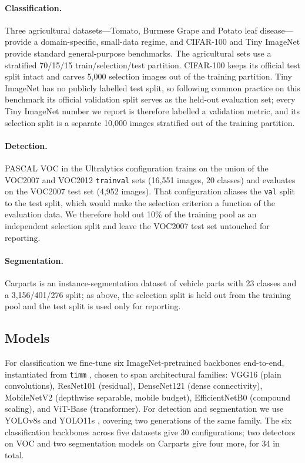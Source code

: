 \paragraph{Classification.}
Three agricultural datasets---Tomato, Burmese Grape and Potato leaf
disease---provide a domain-specific, small-data regime, and CIFAR-100 and Tiny
ImageNet provide standard general-purpose benchmarks. The agricultural sets use
a stratified 70/15/15 train/selection/test partition. CIFAR-100 keeps its
official test split intact and carves 5,000 selection images out of the
training partition. Tiny ImageNet has no publicly labelled test split, so
following common practice on this benchmark
\cite{abai2019densenet,huynh2022vision} its official validation split serves as
the held-out evaluation set; every Tiny ImageNet number we report is therefore
labelled a validation metric, and its selection split is a separate 10,000
images stratified out of the training partition.

\paragraph{Detection.}
PASCAL VOC \cite{everingham2010pascal} in the Ultralytics configuration trains
on the union of the VOC2007 and VOC2012 \texttt{trainval} sets (16,551 images,
20 classes) and evaluates on the VOC2007 test set (4,952 images). That
configuration aliases the \texttt{val} split to the test split, which would
make the selection criterion a function of the evaluation data. We therefore
hold out 10\% of the training pool as an independent selection split and leave
the VOC2007 test set untouched for reporting.

\paragraph{Segmentation.}
Carparts \cite{ultralytics2024carparts} is an instance-segmentation dataset of
vehicle parts with 23 classes and a 3,156/401/276 split; as above, the
selection split is held out from the training pool and the test split is used
only for reporting.

\subsection{Models}

For classification we fine-tune six ImageNet-pretrained backbones end-to-end,
instantiated from \texttt{timm} \cite{rw2019timm}, chosen to span
architectural families: VGG16 \cite{simonyan2015vgg} (plain convolutions),
ResNet101 \cite{he2016deep} (residual), DenseNet121 \cite{huang2017densely}
(dense connectivity), MobileNetV2 \cite{sandler2018mobilenetv2} (depthwise
separable, mobile budget), EfficientNetB0 \cite{tan2019efficientnet} (compound
scaling), and ViT-Base \cite{dosovitskiy2021imageworth16x16words}
(transformer). For detection and segmentation we use YOLOv8s
\cite{jocher2023ultralytics} and YOLO11s \cite{jocher2024yolo11}, covering two
generations of the same family. The six classification backbones across five
datasets give 30 configurations; two detectors on VOC and two segmentation
models on Carparts give four more, for 34 in total.

